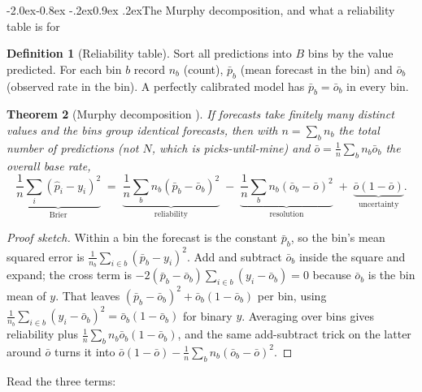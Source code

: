 \documentclass[10pt,a4paper]{article}
\makeatletter
\theoremstyle{plain}
\newtheorem{theorem}{Theorem}[section]
\theoremstyle{definition}
\newtheorem{definition}[theorem]{Definition}
\theoremstyle{remark}
\renewcommand\subsection{\@startsection{subsection}{2}{\z@}%
  {-2.0ex\@plus -0.8ex \@minus -.2ex}{0.9ex \@plus .2ex}{\normalfont\large\bfseries}}
\makeatother
\begin{document}
\subsection{The Murphy decomposition, and what a reliability table is for}

\begin{definition}[Reliability table]
Sort all predictions into $B$ bins by the value predicted. For each bin $b$ record
$n_b$ (count), $\bar p_b$ (mean forecast in the bin) and $\bar o_b$ (observed rate in
the bin). A perfectly calibrated model has $\bar p_b = \bar o_b$ in every bin.
\end{definition}

\begin{theorem}[Murphy decomposition \cite{murphy1973}]
\label{thm:murphy}
If forecasts take finitely many distinct values and the bins group identical forecasts,
then with $n = \sum_b n_b$ the total number of predictions (\emph{not} $N$, which is
picks-until-mine) and $\bar o = \frac{1}{n}\sum_b n_b \bar o_b$ the overall base rate,
\begin{equation}
\underbrace{\frac{1}{n}\sum_{i}(\hat p_i - y_i)^2}_{\text{Brier}}
\;=\;
\underbrace{\frac{1}{n}\sum_b n_b(\bar p_b - \bar o_b)^2}_{\text{reliability}}
\;-\;
\underbrace{\frac{1}{n}\sum_b n_b(\bar o_b - \bar o)^2}_{\text{resolution}}
\;+\;
\underbrace{\bar o(1-\bar o)}_{\text{uncertainty}} .
\label{eq:murphy}
\end{equation}
\end{theorem}

\begin{proof}[Proof sketch]
Within a bin the forecast is the constant $\bar p_b$, so the bin's mean squared error is
$\frac{1}{n_b}\sum_{i \in b}(\bar p_b - y_i)^2$. Add and subtract $\bar o_b$ inside the
square and expand; the cross term is $-2(\bar p_b - \bar o_b)\sum_{i\in b}(y_i - \bar o_b)
= 0$ because $\bar o_b$ is the bin mean of $y$. That leaves
$(\bar p_b - \bar o_b)^2 + \bar o_b(1-\bar o_b)$ per bin, using $\frac{1}{n_b}\sum_{i \in
b}(y_i - \bar o_b)^2 = \bar o_b(1-\bar o_b)$ for binary $y$. Averaging over bins gives
reliability plus $\frac{1}{n}\sum_b n_b \bar o_b (1 - \bar o_b)$, and the same
add-subtract trick on the latter around $\bar o$ turns it into
$\bar o(1-\bar o) - \frac{1}{n}\sum_b n_b(\bar o_b - \bar o)^2$.
\end{proof}

Read the three terms:
\end{document}
